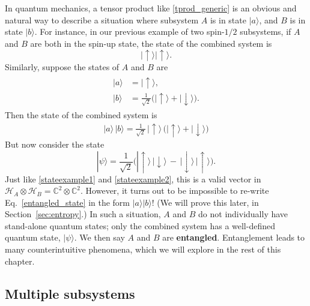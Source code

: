\documentclass[prx,12pt]{revtex4-2}
\begin{document}
In quantum mechanics, a tensor product like \eqref{tprod_generic} is
an obvious and natural way to describe a situation where subsystem $A$
is in state $|a\rangle$, and $B$ is in state $|b\rangle$.  For
instance, in our previous example of two spin-$1/2$ subsystems, if $A$
and $B$ are both in the spin-up state, the state of the combined
system is
\begin{equation}
  |\!\uparrow\rangle |\!\uparrow\rangle.
  \label{stateexample1}
\end{equation}
Similarly, suppose the states of $A$ and $B$ are
\begin{align}
  \begin{aligned}
  |a\rangle &= |\!\uparrow\rangle,\\
  |b\rangle &= \frac{1}{\sqrt{2}}
  \Big(|\!\uparrow\rangle + |\!\downarrow\rangle\Big).
  \end{aligned}
\end{align}
Then the state of the combined system is
\begin{align}
  |a\rangle\, |b\rangle
  = \frac{1}{\sqrt{2}}\, |\!\uparrow\rangle\,
  \Big(|\!\uparrow\rangle + |\!\downarrow\rangle\Big)
  \label{stateexample2}
\end{align}
But now consider the state
\begin{equation}
  |\psi\rangle = \frac{1}{\sqrt{2}}
  \Big(|\!\uparrow\rangle\, |\!\downarrow\rangle
  \,-\, |\!\downarrow\rangle \, |\!\uparrow\rangle\Big).
  \label{entangled_state}
\end{equation}
Just like \eqref{stateexample1} and \eqref{stateexample2}, this is a
valid vector in $\mathscr{H}_A \otimes \mathscr{H}_B =
\mathbb{C}^2\otimes\mathbb{C}^2$.  However, it turns out to be
impossible to re-write Eq.~\eqref{entangled_state} in the form
$|a\rangle|b\rangle$!  (We will prove this later, in
Section~\ref{sec:entropy}.)  In such a situation, $A$ and $B$ do not
individually have stand-alone quantum states; only the combined system
has a well-defined quantum state, $|\psi\rangle$.  We then say $A$ and
$B$ are \textbf{entangled}.  Entanglement leads to many
counterintuitive phenomena, which we will explore in the rest of this
chapter.

\subsection{Multiple subsystems}
\end{document}
